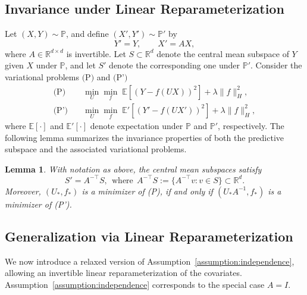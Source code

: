 \documentclass[sn-mathphys-num]{sn-jnl}%
\numberwithin{equation}{section}
\newcommand{\E}{\mathbb{E}}
\renewcommand{\P}{\mathbb{P}}
\newtheorem{lemma}{Lemma}
\theoremstyle{thmstyleone}%
\theoremstyle{thmstyletwo}%
\theoremstyle{thmstylethree}%
\begin{document}
\subsection{Invariance under Linear Reparameterization} 
\indent\indent 
Let $(X,Y)\sim \P$, and define $(X',Y')\sim\P'$ by
\begin{equation*}
Y' = Y,
\qquad
X' = AX,
\end{equation*}
where $A \in \mathbb{R}^{d \times d}$ is invertible. Let $S \subset \mathbb{R}^d$
denote the central mean subspace of $Y$ given $X$ under $\P$, and let $S'$
denote the corresponding one under $\P'$. Consider the variational problems $\text{(P)}$ and $\text{(P')}$
\begin{equation*}
\begin{split}
\text{(P)}\quad  &\min_{U} \min_{f} \; \E\!\left[(Y - f(UX))^2\right] + \lambda \|f\|_H^2, \\
\text{(P')}\quad  &\min_{U} \min_{f} \; \E'\!\left[(Y' - f(UX'))^2\right] + \lambda \|f\|_H^2,
\end{split}
\end{equation*}
where $\E[\cdot]$ and $\E'[\cdot]$ denote expectation under $\P$ and $\P'$,
respectively. The following lemma summarizes the invariance properties of both the
predictive subspace and the associated variational problems.

\vspace{.5em} 

\begin{lemma}
\label{lem:affine-invariance}
With notation as above, the central mean subspaces satisfy
\begin{equation*}
S' = A^{-\top} S,~~\text{where}~~A^{-\top} S := \{ A^{-\top} v : v \in S \} \subset \mathbb{R}^d.
\end{equation*}
Moreover, $(U_*, f_*)$ is a minimizer of \textnormal{(P)}, 
if and only if $(U_* A^{-1}, f_*)$ is a minimizer of \textnormal{(P')}.
\end{lemma}


\subsection{Generalization via Linear Reparameterization} 
\indent\indent
We now introduce a relaxed version of Assumption~\ref{assumption:independence},
allowing an invertible linear reparameterization of the covariates. 
Assumption~\ref{assumption:independence} corresponds to the special case $A = I$.


\renewcommand{\theassumption}{1.3'}
\end{document}
